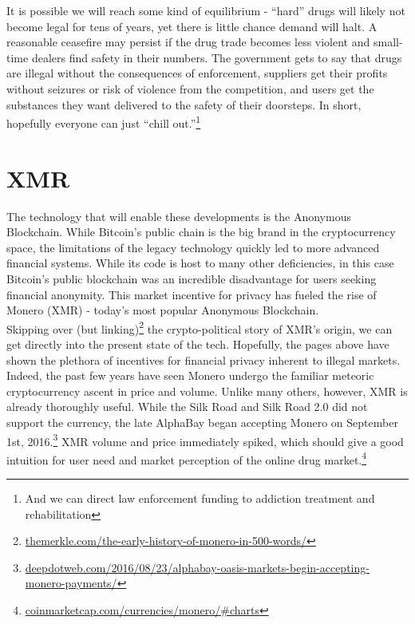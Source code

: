 \documentclass[12pt]{article}
\begin{document}
It is possible we will reach some kind of equilibrium - ``hard'' drugs will likely not become legal for tens of years, yet there is little chance demand will halt. A reasonable ceasefire may persist if the drug trade becomes less violent and small-time dealers find safety in their numbers. The government gets to say that drugs are illegal without the consequences of enforcement, suppliers get their profits without seizures or risk of violence from the competition, and users get the substances they want delivered to the safety of their doorsteps. In short, hopefully everyone can just ``chill out.''\footnote{And we can direct law enforcement funding to addiction treatment and rehabilitation}






\section{XMR}

The technology that will enable these developments is the Anonymous Blockchain. While Bitcoin's public chain is the big brand in the cryptocurrency space, the limitations of the legacy technology quickly led to more advanced financial systems. While its code is host to many other deficiencies, in this case Bitcoin's public blockchain was an incredible disadvantage for users seeking financial anonymity. This market incentive for privacy has fueled the rise of Monero (XMR) - today's most popular Anonymous Blockchain.
\\

Skipping over 
(but linking)\footnote{\url{themerkle.com/the-early-history-of-monero-in-500-words/}} the crypto-political story of XMR's origin, we can get directly into the present state of the tech.
Hopefully, the pages above have shown the plethora of incentives for financial privacy inherent to illegal markets. Indeed, the past few years have seen Monero undergo the familiar meteoric cryptocurrency ascent in price and volume. Unlike many others, however, XMR is already thoroughly useful. While the Silk Road and Silk Road 2.0 did not support the currency, the late AlphaBay began accepting Monero on September 1st, 2016.\footnote{\url{deepdotweb.com/2016/08/23/alphabay-oasis-markets-begin-accepting-monero-payments/}} XMR volume and price immediately spiked, which should give a good intuition for user need and market perception of the online drug market.\footnote{\url{coinmarketcap.com/currencies/monero/#charts}}
\\
\end{document}
